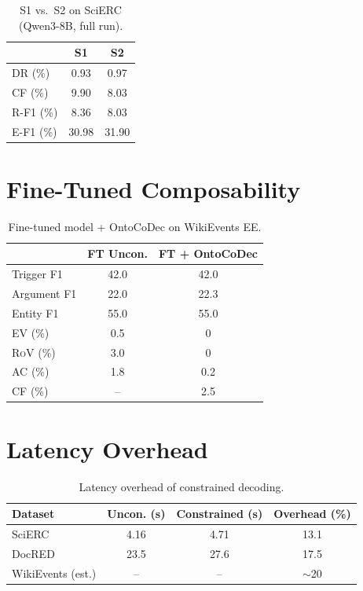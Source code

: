 \documentclass[11pt,a4paper]{article}
\newcommand{\ours}{OntoCoDec}
\newcommand{\drsym}{\textsc{DR}}
\newcommand{\cfsym}{\textsc{CF}}
\newcommand{\evsym}{\textsc{EV}}
\newcommand{\rovsym}{\textsc{RoV}}
\newcommand{\acsym}{\textsc{AC}}
\begin{document}
\begin{table}[h]
\centering
\caption{S1 vs.\ S2 on SciERC (Qwen3-8B, full run).}
\label{tab:s1s2}
\small
\begin{tabular}{lcc}
\toprule
& \textbf{S1} & \textbf{S2} \\
\midrule
\drsym{} (\%) & 0.93 & 0.97 \\
\cfsym{} (\%) & 9.90 & 8.03 \\
R-F1 (\%) & 8.36 & 8.03 \\
E-F1 (\%) & 30.98 & 31.90 \\
\bottomrule
\end{tabular}
\end{table}

\section{Fine-Tuned Composability}
\label{app:ft}

\begin{table}[h]
\centering
\caption{Fine-tuned model + \ours{} on WikiEvents EE.}
\label{tab:ft}
\small
\begin{tabular}{lcc}
\toprule
& \textbf{FT Uncon.} & \textbf{FT + \ours{}} \\
\midrule
Trigger F1 & 42.0 & 42.0 \\
Argument F1 & 22.0 & 22.3 \\
Entity F1 & 55.0 & 55.0 \\
\evsym{} (\%) & 0.5 & 0 \\
\rovsym{} (\%) & 3.0 & 0 \\
\acsym{} (\%) & 1.8 & 0.2 \\
\cfsym{} (\%) & -- & 2.5 \\
\bottomrule
\end{tabular}
\end{table}

\section{Latency Overhead}
\label{app:latency}

\begin{table}[h]
\centering
\caption{Latency overhead of constrained decoding.}
\label{tab:latency}
\small
\begin{tabular}{lccc}
\toprule
\textbf{Dataset} & \textbf{Uncon. (s)} & \textbf{Constrained (s)} & \textbf{Overhead (\%)} \\
\midrule
SciERC & 4.16 & 4.71 & 13.1 \\
DocRED & 23.5 & 27.6 & 17.5 \\
WikiEvents (est.) & -- & -- & $\sim$20 \\
\bottomrule
\end{tabular}
\end{table}
\end{document}
